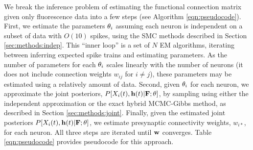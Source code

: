 We break the inference problem of estimating the functional connection matrix given only fluorescence data into a few  steps (see Algorithm \ref{eqn:pseudocode}).  First, we estimate the parameters $\mathbf{\theta}_i$ assuming each neuron is independent on a subset of data with $O(10)$ spikes, using the SMC methods described in Section \ref{sec:methods:indep}.  This ``inner loop'' is a set of $N$ EM algorithms, iterating between inferring expected spike trains and estimating parameters. As the number of parameters for each $\mathbf{\theta}_i$ scales linearly with the number of neurons (it does not include connection weights $w_{ij}$ for $i\neq j$), these parameters may be estimated using a relatively amount of data. 
Second, given $\mathbf{\theta}_i$ for each neuron, we approximate the joint posteriors, $P[X_i(t), \mathbf{h}(t) | {\bf F}; \mathbf{\theta}]$, by sampling using either the independent approximation or the exact hybrid MCMC-Gibbs method, as described in Section \ref{sec:methods:joint}.  
Finally, given the estimated joint posteriors $P[X_i(t), \mathbf{h}(t) | {\bf F}; \mathbf{\theta}]$, we estimate presynaptic connectivity weights, $w_{i \ast}$, for each neuron.  
All three steps are iterated until $\mathbf{w}$ converges. Table \ref{eqn:pseudocode} provides pseudocode for this approach.  

